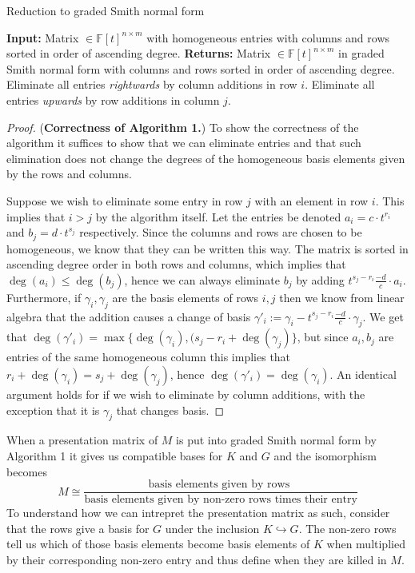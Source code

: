 \begin{algorithm}
\caption{Reduction to graded Smith normal form \cite{skraba, Zomorodian2005}}\label{smith}
\begin{algorithmic}[1]
  \State \textbf{Input:} Matrix $ \in \mathbb{F}[t]^{n \times m}$ with homogeneous entries with columns and rows sorted in order of ascending degree.
  \State \textbf{Returns:} Matrix $ \in \mathbb{F}[t]^{n \times m}$ in graded Smith normal form with columns and rows sorted in order of ascending degree.
  \State Eliminate all entries \textit{rightwards} by column additions in row $i$.
  \State Eliminate all entries \textit{upwards} by row additions in column $j$.
  \EndFor
\end{algorithmic}
\end{algorithm}
\begin{proof}(\textbf{Correctness of Algorithm 1.})
  To show the correctness of the algorithm it suffices to show that we can eliminate entries and that such elimination does not change the degrees of the homogeneous basis elements given by the rows and columns.

  Suppose we wish to eliminate some entry in row $j$ with an element in row $i$. This implies that $ i > j$ by the algorithm itself. Let the entries be denoted $a_{i}= c \cdot t^{r_{i}}$ and $b_{j} = d \cdot t^{s_{j}}$ respectively. Since the columns and rows are chosen to be homogeneous, we know that they can be written this way. The matrix is sorted in ascending degree order in both rows and columns, which implies that $\deg(a_{i}) \leq \deg(b_{j})$, hence we can always eliminate $b_{j}$ by adding $t^{s_{j}-r_{i}} \frac{-d}{c} \cdot a_{i}$. Furthermore, if $\gamma_{i},\gamma_{j}$ are the basis elements of rows $i,j$ then we know from linear algebra that the addition causes a change of basis $\gamma'_{i}:=\gamma_{i}-t^{s_{j}-r_{i}} \frac{-d}{c} \cdot \gamma_{j}$. We get that $\deg(\gamma'_{i})=\max\{\deg(\gamma_{i}), (s_{j}-r_{i}+\deg(\gamma_{j})\}$, but since $a_{i},b_{j}$ are entries of the same homogeneous column this implies that $r_{i} + \deg(\gamma_{i}) = s_{j} + \deg(\gamma_{j})$, hence $\deg(\gamma'_{i}) = \deg(\gamma_{i})$. An identical argument holds for if we wish to eliminate by column additions, with the exception that it is $\gamma_{j}$ that changes basis.
\end{proof}
When a presentation matrix of $M$ is put into graded Smith normal form by Algorithm 1 it gives us compatible bases for $K$ and $G$ and the isomorphism becomes \[M\cong \frac{\text{basis  elements given by rows  }}{\text{basis elements given by non-zero rows times their entry}}\]
To understand how we can intrepret the presentation matrix as such, consider that the rows give a basis for $G$ under the inclusion $K \hookrightarrow G$. The non-zero rows tell us which of those basis elements become basis elements of $K$ when multiplied by their corresponding non-zero entry and thus define when they are killed in $M$.


